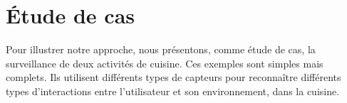 


\section{Étude de cas}
Pour illustrer notre approche, nous présentons, comme étude de cas, la surveillance de deux activités de cuisine. Ces exemples sont simples mais complets. Ils utilisent différents types de capteurs pour reconnaître différents types d'interactions entre l'utilisateur et son environnement, dans la cuisine.

